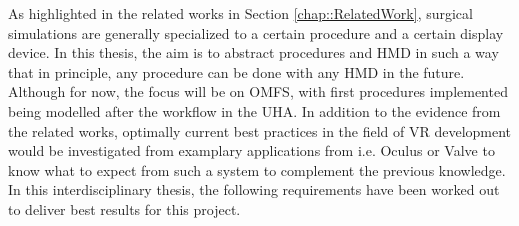 As highlighted in the related works in Section \ref{chap::RelatedWork}, surgical simulations are generally specialized to a certain procedure and a certain display device.
In this thesis, the aim is to abstract procedures and HMD in such a way that in principle, any procedure can be done with any HMD in the future.
Although for now, the focus will be on OMFS, with first procedures implemented being modelled after the workflow in the UHA.
In addition to the evidence from the related works, optimally current best practices in the field of VR development would be investigated from examplary applications from i.e. Oculus or 
Valve to know what to expect from such a system to complement the previous knowledge.
In this interdisciplinary thesis, the following requirements have been worked out to deliver best results for this project. 

